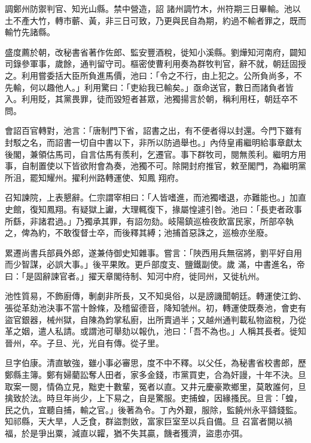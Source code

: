 \begin{pinyinscope}
 調鄭州防禦判官、知光山縣。禁中營造，詔
 諸州調竹木，州符期三日畢輸。池以土不產大竹，轉市蘄、黃，非三日可致，乃更與民自為期，約過不輸者罪之，既而輸竹先諸縣。



 盛度薦於朝，改秘書省著作佐郎、監安豐酒稅，徙知小溪縣。劉燁知河南府，闢知司錄參軍事，歲餘，通判留守司。樞密使曹利用奏為群牧判官，辭不就，朝廷固授之。利用嘗委括大臣所負進馬價，池曰：「令之不行，由上犯之。公所負尚多，不先輸，何以趣他人。」利用驚曰：「吏紿我已輸矣。」亟命送官，數日而諸負者皆
 入。利用貶，其黨畏罪，徒而毀短者甚眾，池獨揚言於朝，稱利用枉，朝廷卒不問。



 會詔百官轉對，池言：「唐制門下省，詔書之出，有不便者得以封還。今門下雖有封駁之名，而詔書一切自中書以下，非所以防過舉也。」內侍皇甫繼明給事章獻太後閣，兼領估馬司，自言估馬有羨利，乞遷官。事下群牧司，閱無羨利。繼明方用事，自制置使以下皆欲附會為奏，池獨不可。除開封府推官，敕至閣門，為繼明黨所沮，罷知耀州。擢利州路轉運使、知鳳
 翔府。



 召知諫院，上表懇辭。仁宗謂宰相曰：「人皆嗜進，而池獨嗜退，亦難能也。」加直史館，復知鳳翔。有疑獄上讞，大理輒復下，掾屬惶遽引咎。池曰：「長吏者政事所繇，非諸君過。」乃獨承其罪，有詔勿劾。岐陽鎮巡檢夜飲富民家，所部卒執之，俾為約，不敢復督士卒，而後釋其縛；池捕首惡誅之，巡檢亦坐廢。



 累遷尚書兵部員外郎，遂兼侍御史知雜事。嘗言：「陜西用兵無宿將，劉平好自用而少智謀，必誤大事。」後平果敗。更戶部度支、鹽鐵副使。歲
 滿，中書進名，帝曰：「是固辭諫官者。」擢天章閣待制、知河中府，徙同州，又徙杭州。



 池性質易，不飾廚傳，剸劇非所長，又不知吳俗，以是謗譏聞朝廷。轉運使江鈞、張從革劾池決事不當十餘條，及稽留德音，降知虢州。初，轉運使既奏池，會吏有盜官銀器，械州獄，自陳為鈞掌私廚，出所賣過半；又越州通判載私物盜稅，乃從革之姻，遣人私請。或謂池可舉劾以報仇，池曰：「吾不為也。」人稱其長者。徙知晉州，卒。子旦、光，光自有傳。從子里。



 旦字伯康。清直敏強，雖小事必審思，度不中不釋。以父任，為秘書省校書郎，歷鄭縣主簿。鄭有婦藺訟奪人田者，家多金錢，市黨買吏，合為奸謾，十年不決。旦取案一閱，情偽立見，黜吏十數輩，冤者以直。又井元慶豪欺鄉里，莫敢誰何，旦擒致於法。時旦年尚少，上下易之，自是驚服。吏捕蝗，因緣搔民。旦言：「蝗，民之仇，宜聽自捕，輸之官。」後著為令。丁內外艱，服除，監饒州永平鑄錢監。知祁縣，天大旱，人乏食，群盜剽敓，富家巨室至以兵自備。旦
 召富者開以禍福，於是爭出粟，減直以糶，猶不失其贏，饑者獲濟，盜患亦弭。




\end{pinyinscope}
